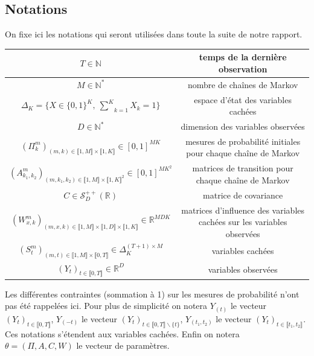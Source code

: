 \documentclass[10pt,a4paper]{article}
\begin{document}
\subsection{Notations}
On fixe ici les notations qui seront utilisées dans toute la suite de notre 
rapport.
\newline
\begin{center}
\begin{tabular}{|c|c|} 
\hline
$T \in \mathbb{N}$ & temps de la dernière observation \\ \hline
$M \in \mathbb{N}^*$ & nombre de chaînes de Markov \\ \hline
$\Delta_K=\lbrace X \in \lbrace0,1\rbrace^K, \ 
\underset{k=1}{\overset{K}{\sum}}X_k=1\rbrace$ & espace d'état des variables 
cachées \\ \hline
$D \in \mathbb{N}^*$ & dimension des variables observées \\ \hline
$(\Pi_{k}^m)_{(m,k) \in \llbracket 1,M \rrbracket \times \llbracket 1,K 
\rrbracket} \in [0,1]^{MK}$ & mesures de probabilité initiales pour chaque 
chaîne de Markov \\ \hline
$(A_{k_1,k_2}^m)_{(m,k_1,k_2) \in \llbracket 1,M \rrbracket \times \llbracket 
1,K \rrbracket^2} \in [0,1]^{MK^2}$ & matrices de transition pour chaque chaîne 
de Markov \\ \hline
$C \in \mathcal{S}_D^{++}(\mathbb{R})$ & matrice de covariance \\ \hline
$(W_{x,k}^m)_{(m,x,k) \in \llbracket 1,M \rrbracket \times \llbracket 1,D 
\rrbracket \times \llbracket 1,K \rrbracket} \in \mathbb{R}^{MDK}$ & matrices 
d'influence des variables cachées sur les variables observées \\ \hline
$(S_t^m)_{(m,t) \in \llbracket 1,M \rrbracket \times \llbracket 0,T \rrbracket 
} \in \Delta_K^{(T+1)\times M}$ & variables cachées \\ \hline
$(Y_t)_{t \in \llbracket 0,T \rrbracket} \in \mathbb{R}^D$ & variables 
observées \\ \hline
\end{tabular}
\end{center}

Les différentes contraintes (sommation à 1) sur les mesures de probabilité 
n'ont pas été rappelées ici. Pour plus de simplicité on notera $Y_{(t)}$ le 
vecteur $(Y_t)_{t \in \llbracket 0,T \rrbracket}$, $Y_{(-t)}$ le vecteur 
$(Y_{t})_{t \in \llbracket 0,T \rrbracket\backslash \lbrace t \rbrace}$, 
$Y_{(t_1,t_2)}$ le vecteur $(Y_t)_{t \in \llbracket t_1,t_2 \rrbracket}$. Ces 
notations s'étendent aux variables cachées. Enfin on notera $\theta=(\Pi, 
A,C,W)$ le vecteur de paramètres.
\end{document}
